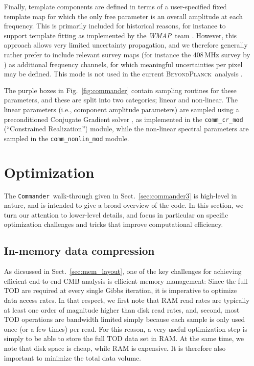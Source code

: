 \documentclass[twocolumn]{aa}
\def\WMAP{\emph{WMAP}}
\def\commander{\texttt{Commander}}
\newcommand{\BP}{\textsc{BeyondPlanck}}
\begin{document}
Finally, template components are defined in terms of a user-specified
fixed template map for which the only free parameter is an overall
amplitude at each frequency. This is primarily included for historical
reasons, for instance to support template fitting as implemented by
the \WMAP\ team \citep{bennett2012}. However, this approach allows
very limited uncertainty propagation, and we therefore generally
rather prefer to include relevant survey maps (for instance the
408\,MHz survey by \citealp{haslam1982}) as additional frequency
channels, for which meaningful uncertainties per pixel may be
defined. This mode is not used in the current \BP\ analysis
\citep{BP01}.

The purple boxes in Fig.~\ref{fig:commander} contain sampling routines
for these parameters, and these are split into two categories; linear
and non-linear. The linear parameters (i.e., component amplitude
parameters) are sampled using a preconditioned Conjugate Gradient
solver \citep{seljebotn:2019}, as implemented in the
\texttt{comm\_cr\_mod} (``Constrained Realization'') module, while the
non-linear spectral parameters are sampled in the
\texttt{comm\_nonlin\_mod} module. 


\section{Optimization}
\label{sec:tricks}

The \commander\ walk-through given in Sect.~\ref{sec:commander3} is
high-level in nature, and is intended to give a broad overview of the
code. In this section, we turn our attention to lower-level details,
and focus in particular on specific optimization challenges and tricks
that improve computational efficiency.

\subsection{In-memory data compression}
\label{sec:compression}

As dicsussed in Sect.~\ref{sec:mem_layout}, one of the key challenges
for achieving efficient end-to-end CMB analysis is efficient memory
management: Since the full TOD are required at every single Gibbs
iteration, it is imperative to optimize data access rates. In that
respect, we first note that RAM read rates are typically at least one
order of magnitude higher than disk read rates, and, second, most TOD
operations are bandwidth limited simply because each sample is only
used once (or a few times) per read. For this reason, a very useful
optimization step is simply to be able to store the full TOD data set
in RAM. At the same time, we note that disk space is cheap, while RAM
is expensive. It is therefore also important to minimize the total
data volume.
\end{document}
